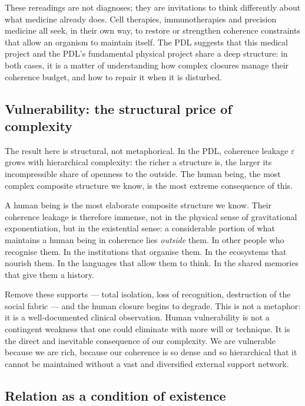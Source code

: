 \documentclass[11pt, a4paper, openright]{book}
\begin{document}
\medskip

These rereadings are not diagnoses; they are invitations to think differently about what medicine already does. Cell therapies, immunotherapies and precision medicine all seek, in their own way, to restore or strengthen coherence constraints that allow an organism to maintain itself. The PDL suggests that this medical project and the PDL’s fundamental physical project share a deep structure: in both cases, it is a matter of understanding how complex closures manage their coherence budget, and how to repair it when it is disturbed.

\subsection*{Vulnerability: the structural price of complexity}

The result here is structural, not metaphorical. In the PDL, coherence leakage $\varepsilon$ grows with hierarchical complexity: the richer a structure is, the larger its incompressible share of openness to the outside. The human being, the most complex composite structure we know, is the most extreme consequence of this.

\medskip

A human being is the most elaborate composite structure we know. Their coherence leakage is therefore immense, not in the physical sense of gravitational exponentiation, but in the existential sense: a considerable portion of what maintains a human being in coherence lies \emph{outside} them. In other people who recognise them. In the institutions that organise them. In the ecosystems that nourish them. In the languages that allow them to think. In the shared memories that give them a history.

\medskip

Remove these supports — total isolation, loss of recognition, destruction of the social fabric — and the human closure begins to degrade. This is not a metaphor: it is a well-documented clinical observation. Human vulnerability is not a contingent weakness that one could eliminate with more will or technique. It is the direct and inevitable consequence of our complexity. We are vulnerable because we are rich, because our coherence is so dense and so hierarchical that it cannot be maintained without a vast and diversified external support network.

\subsection*{Relation as a condition of existence}
\end{document}
